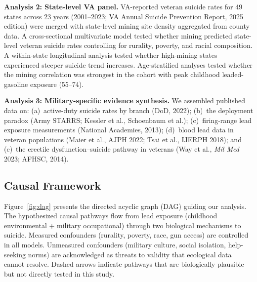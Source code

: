 \documentclass[11pt,twocolumn]{article}
\begin{document}
\textbf{Analysis 2: State-level VA panel.} VA-reported veteran suicide rates for 49 states across 23 years (2001--2023; VA Annual Suicide Prevention Report, 2025 edition) were merged with state-level mining site density aggregated from county data. A cross-sectional multivariate model tested whether mining predicted state-level veteran suicide rates controlling for rurality, poverty, and racial composition. A within-state longitudinal analysis tested whether high-mining states experienced steeper suicide trend increases. Age-stratified analyses tested whether the mining correlation was strongest in the cohort with peak childhood leaded-gasoline exposure (55--74).

\textbf{Analysis 3: Military-specific evidence synthesis.} We assembled published data on: (a)~active-duty suicide rates by branch (DoD, 2022); (b)~the deployment paradox (Army STARRS; Kessler et al., Schoenbaum et al.); (c)~firing-range lead exposure measurements (National Academies, 2013); (d)~blood lead data in veteran populations (Maier et al., AJPH 2022; Tsai et al., IJERPH 2018); and (e)~the erectile dysfunction--suicide pathway in veterans (Way et al., \textit{Mil Med} 2023; AFHSC, 2014).

\subsection{Causal Framework}

Figure~\ref{fig:dag} presents the directed acyclic graph (DAG) guiding our analysis. The hypothesized causal pathways flow from lead exposure (childhood environmental + military occupational) through two biological mechanisms to suicide. Measured confounders (rurality, poverty, race, gun access) are controlled in all models. Unmeasured confounders (military culture, social isolation, help-seeking norms) are acknowledged as threats to validity that ecological data cannot resolve. Dashed arrows indicate pathways that are biologically plausible but not directly tested in this study.
\end{document}
